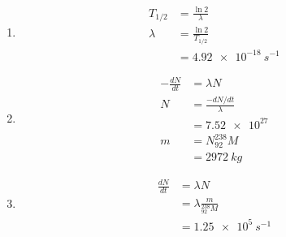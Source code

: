 \documentclass{article}
\begin{document}
\begin{enumerate}
  \item

        \begin{align*}
          T_{1 / 2} & = \frac{\ln 2}{\lambda}   \\
          \lambda   & = \frac{\ln 2}{T_{1 / 2}} \\
                    & = \qty{4.92e-18}{s^{-1}}
        \end{align*}

  \item

        \begin{align*}
          -\frac{d N}{d t} & = \lambda N                  \\
          N                & = \frac{-d N / d t}{\lambda} \\
                           & = \num{7.52e27}              \\
          m                & = N ^{238}_{92} M            \\
                           & = \qty{2972}{kg}
        \end{align*}

  \item

        \begin{align*}
          \frac{d N}{d t} & = \lambda N                       \\
                          & = \lambda \frac{m}{^{238}_{92} M} \\
                          & = \qty{1.25e5}{s^{-1}}
        \end{align*}
\end{enumerate}

\setcounter{subsubsection}{22}
\subsubsection{}
\end{document}
